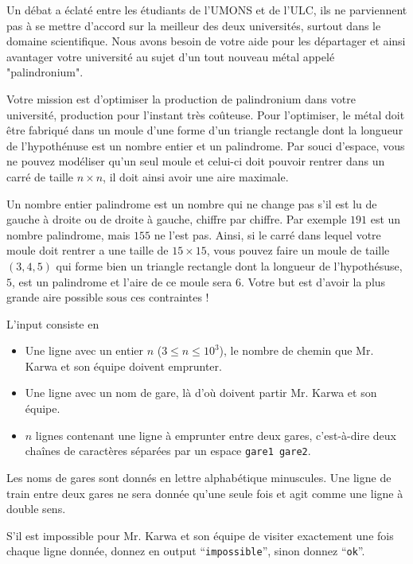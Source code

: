 \problemname{\problemyamlname}

Un débat a éclaté entre les étudiants de l'UMONS et de l'ULC, ils ne parviennent pas à se mettre d'accord sur la meilleur des deux universités, surtout dans le domaine scientifique. Nous avons besoin de votre aide pour les départager et ainsi avantager votre université au sujet d'un tout nouveau métal appelé "palindronium".

Votre mission est d'optimiser la production de palindronium dans votre université, production pour l'instant très coûteuse. Pour l'optimiser, le métal doit être fabriqué dans un moule d'une forme d'un triangle rectangle dont la longueur de l'hypothénuse est un nombre entier et un palindrome. Par souci d'espace, vous ne pouvez modéliser qu'un seul moule et celui-ci doit pouvoir rentrer dans un carré de taille $n\times n$, il doit ainsi avoir une aire maximale.

Un nombre entier palindrome est un nombre qui ne change pas s'il est lu de gauche à droite ou de droite à gauche, chiffre par chiffre. Par exemple $191$ est un nombre palindrome, mais $155$ ne l'est pas. Ainsi, si le carré dans lequel votre moule doit rentrer a une taille de $15\times 15$, vous pouvez faire un moule de taille $(3,4,5)$ qui forme bien un triangle rectangle dont la longueur de l'hypothésuse, $5$, est un palindrome et l'aire de ce moule sera $6$. Votre but est d'avoir la plus grande aire possible sous ces contraintes !

\begin{Input}
    L'input consiste en
    \begin{itemize}
        \item Une ligne avec un entier $n$ ($3\leq n\leq 10^3$), le nombre de chemin que Mr. Karwa et son équipe doivent emprunter.
        \item Une ligne avec un nom de gare, là d'où doivent partir Mr. Karwa et son équipe.
        \item $n$ lignes contenant une ligne à emprunter entre deux gares, c'est-à-dire deux chaînes de caractères séparées par un espace \texttt{gare1 gare2}.
    \end{itemize}
    Les noms de gares sont donnés en lettre alphabétique minuscules. Une ligne de train entre deux gares ne sera donnée qu'une seule fois et agit comme une ligne à double sens.
\end{Input}

\begin{Output}
    S'il est impossible pour Mr. Karwa et son équipe de visiter exactement une fois chaque ligne donnée, donnez en output ``\texttt{impossible}'', sinon donnez ``\texttt{ok}''.
\end{Output}
